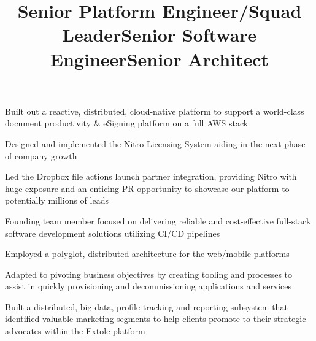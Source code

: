 \documentclass[margin,line]{resume}
\newenvironment{bullet-list}{
  \begin{list}{$\bullet$}{%
      \setlength{\itemsep}{0in}
      \setlength{\parsep}{0in} \setlength{\parskip}{0in}
      \setlength{\topsep}{0in} \setlength{\partopsep}{0in}
      \setlength{\leftmargin}{0.2in}}}{\end{list}}
\begin{document}
\begin{resume}
\title{Senior Platform Engineer/Squad Leader}
\begin{position}
\vspace{-.3cm}
\begin{bullet-list}
\item Built out a reactive, distributed, cloud-native platform to support a
world-class document productivity \& eSigning platform on a full AWS stack
\item Designed and implemented the Nitro Licensing System aiding in
the next phase of company growth
\item Led the Dropbox file actions launch partner integration, providing Nitro
with huge exposure and an enticing PR opportunity to showcase our platform to
potentially millions of leads
\end{bullet-list}
\end{position}

\title{Senior Software Engineer}
\begin{position}
\vspace{-.3cm}
\begin{bullet-list}
\item Founding team member focused on delivering reliable and
cost-effective full-stack software development solutions utilizing CI/CD pipelines
\item Employed a polyglot, distributed architecture for the web/mobile platforms
\item Adapted to pivoting business objectives by creating tooling and processes
to assist in quickly provisioning and decommissioning applications and services
\end{bullet-list}
\end{position}

\title{Senior Architect}
\begin{position}
\vspace{-.3cm}
\begin{bullet-list}
\item Built a distributed, big-data, profile tracking and reporting subsystem
that identified valuable marketing segments to help clients promote to
their strategic advocates within the Extole platform
\end{bullet-list}
\end{position}


\end{resume}
\end{document}
